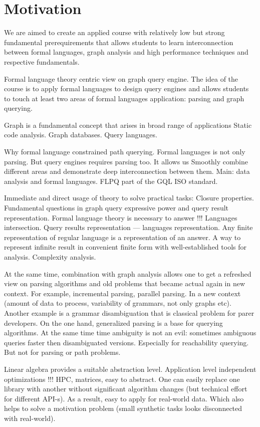 \documentclass[sigconf]{acmart}
\begin{document}
\section{Motivation}

We are aimed to create an applied course with relatively low but strong fundamental prerequirements that allows students to learn interconnection between formal languages, graph analysis and high performance techniques and respective fundamentals.

Formal language theory centric view on graph query engine.
The idea of the course is to apply formal languages to design query engines and allows students to touch at least two areas of formal languages application: parsing and graph querying.

Graph is a fundamental concept that arises in broad range of applications Static code analysis. Graph databases. Query languages.

Why formal language constrained path querying. 
Formal languages is not only parsing.
But query engines requires parsing too.
It allows us Smoothly combine different areas and demonstrate deep interconnection between them.
Main: data analysis and formal languages.
FLPQ part of the GQL ISO standard.

Immediate and direct usage of theory to solve practical tasks: Closure properties.
Fundamental questions in graph query expressive power and query result representation. 
Formal language theory is necessary to answer !!!
 Languages intersection.
Query results representation --- languages representation.
Any finite representation of regular language is a representation of an answer.
A way to represent infinite result in convenient finite form with well-established tools for analysis.
Complexity analysis.

At the same time, combination with graph analysis allows one to get a refreshed view on parsing algorithms and old problems that became actual again in new context.
For example, incremental parsing, parallel parsing. 
In a new context (amount of data to process, variability of grammars, not only graphs etc).
Another example is a grammar disambiguation that is classical problem for parer developers.
On the one hand, generalized parsing is a base for querying algorithms. 
At the same time time ambiguity is not an evil: sometimes ambiguous queries faster then disambiguated versions.
Especially for reachability querying.
But not for parsing or path problems.

Linear algebra provides a suitable abstraction level. 
Application level independent optimizations !!! HPC, matrices, easy to abstract.
One can easily replace one library with another without significant algorithm changes (but technical effort for different API-s).
As a result, easy to apply for real-world data.
Which also helps to solve a motivation problem (small synthetic tasks looks disconnected with real-world).
\end{document}
